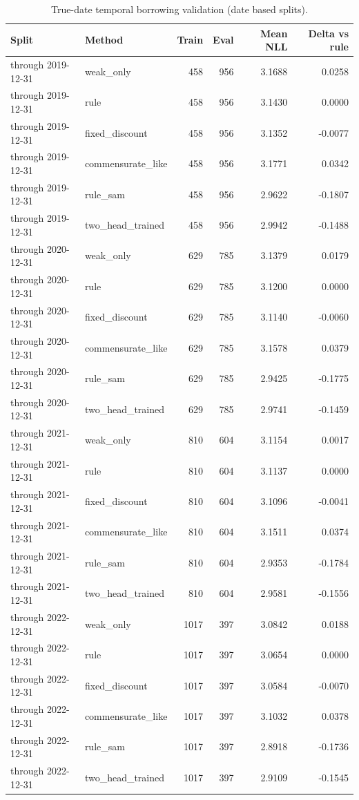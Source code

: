 \begin{table}[htbp]
\centering
\small
\caption{True-date temporal borrowing validation (date based splits).}
\label{tab:temporal-date-based}
\begin{tabular}{llrrrr}
\toprule
Split & Method & Train & Eval & Mean NLL & Delta vs rule \\
\midrule
through 2019-12-31 & weak\_only & 458 & 956 & 3.1688 & 0.0258 \\
through 2019-12-31 & rule & 458 & 956 & 3.1430 & 0.0000 \\
through 2019-12-31 & fixed\_discount & 458 & 956 & 3.1352 & -0.0077 \\
through 2019-12-31 & commensurate\_like & 458 & 956 & 3.1771 & 0.0342 \\
through 2019-12-31 & rule\_sam & 458 & 956 & 2.9622 & -0.1807 \\
through 2019-12-31 & two\_head\_trained & 458 & 956 & 2.9942 & -0.1488 \\
through 2020-12-31 & weak\_only & 629 & 785 & 3.1379 & 0.0179 \\
through 2020-12-31 & rule & 629 & 785 & 3.1200 & 0.0000 \\
through 2020-12-31 & fixed\_discount & 629 & 785 & 3.1140 & -0.0060 \\
through 2020-12-31 & commensurate\_like & 629 & 785 & 3.1578 & 0.0379 \\
through 2020-12-31 & rule\_sam & 629 & 785 & 2.9425 & -0.1775 \\
through 2020-12-31 & two\_head\_trained & 629 & 785 & 2.9741 & -0.1459 \\
through 2021-12-31 & weak\_only & 810 & 604 & 3.1154 & 0.0017 \\
through 2021-12-31 & rule & 810 & 604 & 3.1137 & 0.0000 \\
through 2021-12-31 & fixed\_discount & 810 & 604 & 3.1096 & -0.0041 \\
through 2021-12-31 & commensurate\_like & 810 & 604 & 3.1511 & 0.0374 \\
through 2021-12-31 & rule\_sam & 810 & 604 & 2.9353 & -0.1784 \\
through 2021-12-31 & two\_head\_trained & 810 & 604 & 2.9581 & -0.1556 \\
through 2022-12-31 & weak\_only & 1017 & 397 & 3.0842 & 0.0188 \\
through 2022-12-31 & rule & 1017 & 397 & 3.0654 & 0.0000 \\
through 2022-12-31 & fixed\_discount & 1017 & 397 & 3.0584 & -0.0070 \\
through 2022-12-31 & commensurate\_like & 1017 & 397 & 3.1032 & 0.0378 \\
through 2022-12-31 & rule\_sam & 1017 & 397 & 2.8918 & -0.1736 \\
through 2022-12-31 & two\_head\_trained & 1017 & 397 & 2.9109 & -0.1545 \\
\bottomrule
\end{tabular}
\end{table}
